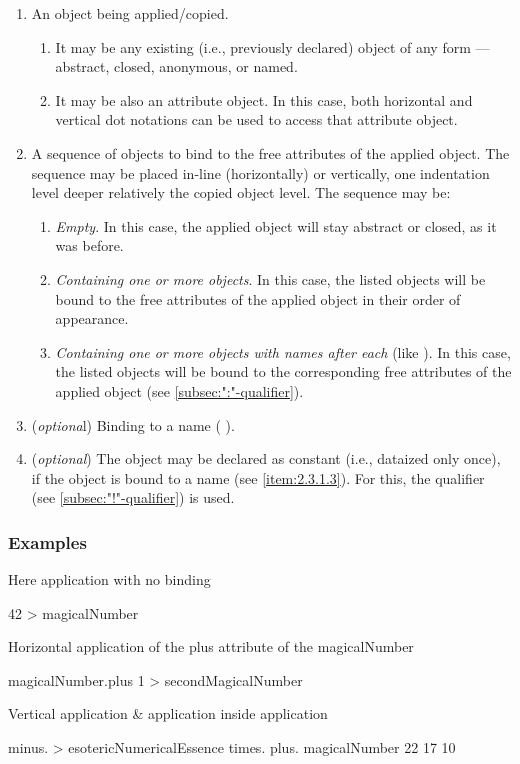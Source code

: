 \documentclass[12pt]{book}
\begin{document}
\begin{enumerate}
    \item An object being applied/copied.
    \begin{enumerate}
        \item It may be any existing (i.e., previously declared) object of any form — abstract, closed, anonymous, or named.
        \item It may be also an attribute object. In this case, both horizontal and vertical dot notations can be used to access that attribute object.
    \end{enumerate}
    \item A sequence of objects to bind to the free attributes of the applied object. The sequence may be placed in-line (horizontally) or vertically, one indentation level deeper relatively the copied object level. The sequence may be:
    \begin{enumerate}
        \item \textit{Empty}. In this case, the applied object will stay abstract or closed, as it was before.
        \item \textit{Containing one or more objects}. In this case, the listed objects will be bound to the free attributes of the applied object in their order of appearance.
        \item \textit{Containing one or more objects with names after each} (like   ). In this case, the listed objects will be bound to the corresponding free attributes of the applied object (see \ref{subsec:":"-qualifier}).
    \end{enumerate}
    \item \label{item:2.4.1.3} (\textit{optiona}l) Binding to a name ( ).
    \item (\textit{optional}) The object may be declared as constant (i.e., dataized only once), if the object is bound to a name (see \ref{item:2.3.1.3}). For this, the \ff{!} qualifier (see \ref{subsec:"!"-qualifier}) is used.
\end{enumerate}

\subsubsection{Examples}

Here application with no binding
\begin{ffcode}
42 > magicalNumber
\end{ffcode}
Horizontal application of the plus attribute of the magicalNumber
\begin{ffcode}
magicalNumber.plus 1 > secondMagicalNumber
\end{ffcode}
Vertical application \& application inside application
\begin{ffcode}
minus. > esotericNumericalEssence
  times.
    plus.
      magicalNumber
      22
    17
  10
\end{ffcode}
\end{document}
